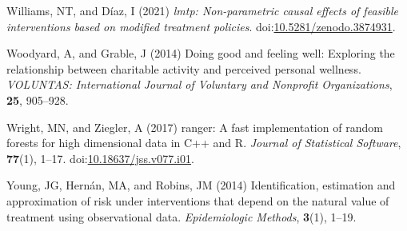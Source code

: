 \documentclass[
  single column]{article}
\newlength{\cslhangindent}
\newenvironment{CSLReferences}[2] %
 {\begin{list}{}{%
  \setlength{\itemindent}{0pt}
  \setlength{\leftmargin}{0pt}
  \setlength{\parsep}{0pt}
  \ifodd #1
   \setlength{\leftmargin}{\cslhangindent}
   \setlength{\itemindent}{-1\cslhangindent}
  \fi
  \setlength{\itemsep}{#2\baselineskip}}}
 {\end{list}}
\begin{document}
\begin{CSLReferences}{1}{0}
Williams, NT, and Díaz, I (2021) \emph{{l}mtp: Non-parametric causal
effects of feasible interventions based on modified treatment policies}.
doi:\href{https://doi.org/10.5281/zenodo.3874931}{10.5281/zenodo.3874931}.

Woodyard, A, and Grable, J (2014) Doing good and feeling well: Exploring
the relationship between charitable activity and perceived personal
wellness. \emph{VOLUNTAS: International Journal of Voluntary and
Nonprofit Organizations}, \textbf{25}, 905--928.

Wright, MN, and Ziegler, A (2017) {ranger}: A fast implementation of
random forests for high dimensional data in {C++} and {R}. \emph{Journal
of Statistical Software}, \textbf{77}(1), 1--17.
doi:\href{https://doi.org/10.18637/jss.v077.i01}{10.18637/jss.v077.i01}.

Young, JG, Hernán, MA, and Robins, JM (2014) Identification, estimation
and approximation of risk under interventions that depend on the natural
value of treatment using observational data. \emph{Epidemiologic
Methods}, \textbf{3}(1), 1--19.

\end{CSLReferences}
\end{document}
